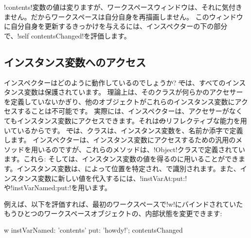 \documentclass[a4paper,10pt,twoside]{book}
\begin{document}
\ct!contents!変数の値は変りますが、ワークスペースウィンドウは、それに気付きません。だからワークスペースは自分自身を再描画しません。
このウィンドウに自分自身を更新するきっかけを与えるには、インスペクターの下の部分で、\ct!self contentsChanged!を評価します。 %

\subsection{インスタンス変数へのアクセス}

インスペクターはどのように動作しているのでしょうか?
\st では、すべてのインスタンス変数は保護されています。
理論上は、そのクラスが何らかのアクセサーを定義していないかぎり、他のオブジェクトがこれらのインスタンス変数にアクセスすることは不可能です。
実際には、インスペクターは、アクセサーがなくてもインスタンス変数にアクセスできます。それは\st のリフレクティブな能力を用いているからです。
\st では、クラスは、インスタンス変数を、名前か添字で定義します。
インスペクターは、インスタンス変数にアクセスするための汎用のメソッドを用いるのですが、これらのメソッドは、\ct!Object!クラスで定義されています。これら: そしては、インスタンス変数の値を得るのに用いることができます。インスタンス変数は、によって位置を特定され、で識別されます。また、インスタンス変数に新しい値を代入するには、\ct!instVarAt:put:!や\ct!instVarNamed:put:!を用います。 %

例えば、以下を評価すれば、最初のワークスペースで\ct!w!にバインドされていたもうひとつのワークスペースオブジェクトの、内部状態を変更できます:
\begin{code}{}
w instVarNamed: 'contents' put: 'howdy!'; contentsChanged
\end{code}

\end{document}

